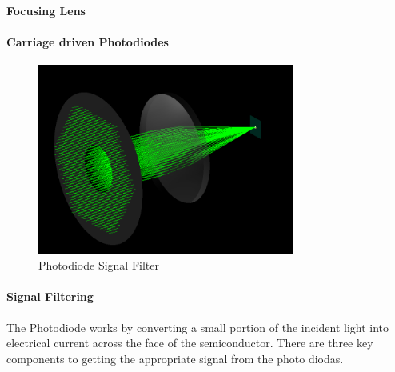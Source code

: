 \paragraph{Focusing Lens}

\paragraph{Carriage driven Photodiodes}

\begin{figure}[H]
    \caption{Photodiode Signal Filter}
    \centering
    \includegraphics[width=0.75\textwidth]{images/ColimatedBeam.png}
\end{figure}

\paragraph{Signal Filtering}
The Photodiode works by converting a small portion of the incident light into electrical current across the face of the semiconductor. There are three key components to getting the appropriate signal from the photo diodas. 

